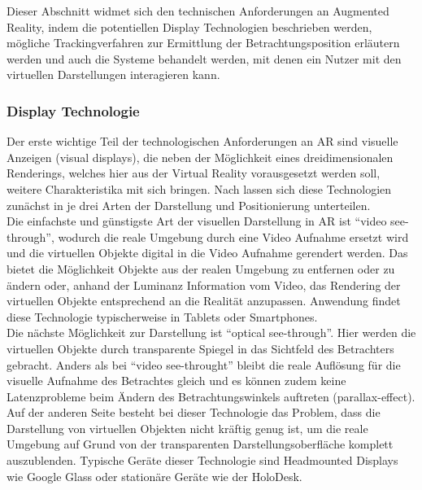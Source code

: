 Dieser Abschnitt widmet sich den technischen Anforderungen an Augmented Reality, indem die potentiellen Display Technologien beschrieben werden, mögliche Trackingverfahren zur Ermittlung der Betrachtungsposition erläutern werden und auch die Systeme behandelt werden, mit denen ein Nutzer mit den virtuellen Darstellungen interagieren kann.\\

\subsubsection{Display Technologie}

Der erste wichtige Teil der technologischen Anforderungen an AR sind visuelle Anzeigen (visual displays), die neben der Möglichkeit eines dreidimensionalen Renderings, welches hier aus der Virtual Reality vorausgesetzt werden soll, weitere Charakteristika mit sich bringen. Nach \citet{van2010survey} lassen sich diese Technologien zunächst in je drei Arten der Darstellung und Positionierung unterteilen.  \\

Die einfachste und günstigste Art der visuellen Darstellung in AR ist \enquote{video see-through}, wodurch die reale Umgebung durch eine Video Aufnahme ersetzt wird und die virtuellen Objekte digital in die Video Aufnahme gerendert werden. Das bietet die Möglichkeit Objekte aus der realen Umgebung zu entfernen oder zu ändern oder, anhand der Luminanz Information vom Video, das Rendering der virtuellen Objekte entsprechend an die Realität anzupassen. Anwendung findet diese Technologie typischerweise in Tablets oder Smartphones.\\

Die nächste Möglichkeit zur Darstellung ist \enquote{optical see-through}. Hier werden die virtuellen Objekte durch transparente Spiegel in das Sichtfeld des Betrachters gebracht. Anders als bei \enquote{video see-throught} bleibt die reale Auflösung für die visuelle Aufnahme des Betrachtes gleich und es können zudem keine Latenzprobleme beim Ändern des Betrachtungswinkels auftreten (parallax-effect). Auf der anderen Seite besteht bei dieser Technologie das Problem, dass die Darstellung von virtuellen Objekten nicht kräftig genug ist, um die reale Umgebung auf Grund von der transparenten Darstellungsoberfläche komplett auszublenden. Typische Geräte dieser Technologie sind Headmounted Displays wie Google Glass oder stationäre Geräte wie der HoloDesk.\\

